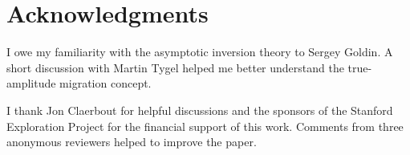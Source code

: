 \section{Acknowledgments}
I owe my familiarity with the asymptotic inversion theory to Sergey
Goldin. A short discussion with Martin Tygel helped me better
understand the true-amplitude migration concept.

I thank Jon Claerbout for helpful discussions and the sponsors of the Stanford
Exploration Project for the financial support of this work. Comments
  from three anonymous reviewers helped to improve the paper.


